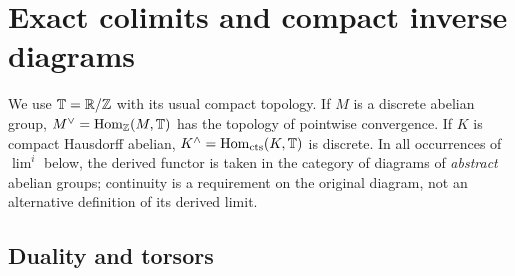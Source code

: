 \section{Exact colimits and compact inverse diagrams}
\label{sec:C}

We use $\mathbb T=\mathbb R/\mathbb Z$ with its usual compact topology. If $M$ is a discrete abelian group, $M^\vee=\operatorname{Hom}_{\mathbb Z}(M,\mathbb T)$ has the topology of pointwise convergence. If $K$ is compact Hausdorff abelian, $K^\wedge=\operatorname{Hom}_{\mathrm{cts}}(K,\mathbb T)$ is discrete. In all occurrences of $\lim^i$ below, the derived functor is taken in the category of diagrams of \emph{abstract} abelian groups; continuity is a requirement on the original diagram, not an alternative definition of its derived limit.

\subsection{Duality and torsors}


